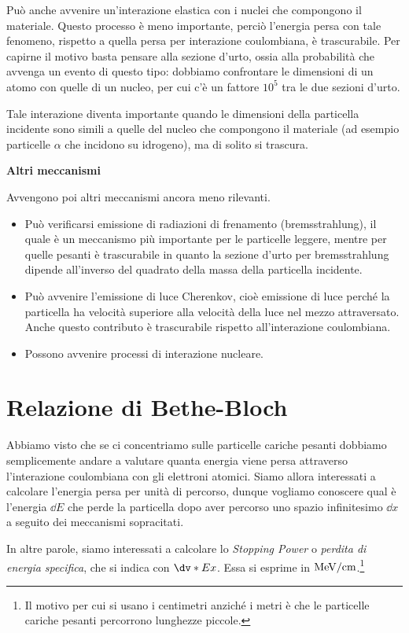 Può anche avvenire un'interazione elastica con i nuclei che compongono il materiale. Questo processo è meno importante, perciò l'energia persa con tale fenomeno, rispetto a quella persa per interazione coulombiana, è trascurabile. Per capirne il motivo basta pensare alla sezione d'urto, ossia alla probabilità che avvenga un evento di questo tipo: dobbiamo confrontare le dimensioni di un atomo con quelle di un nucleo, per cui c'è un fattore $10^5$ tra le due sezioni d'urto.

Tale interazione diventa importante quando le dimensioni della particella incidente sono simili a quelle del nucleo che compongono il materiale (ad esempio particelle $\alpha$ che incidono su idrogeno), ma di solito si trascura.

\vspace{0.2cm}\textbf{Altri meccanismi}

Avvengono poi altri meccanismi ancora meno rilevanti.
\begin{itemize}
    \item Può verificarsi emissione di radiazioni di frenamento (bremsstrahlung), il quale è un meccanismo più importante per le particelle leggere, mentre per quelle pesanti è trascurabile in quanto la sezione d'urto per bremsstrahlung dipende all'inverso del quadrato della massa della particella incidente.
    \item Può avvenire l'emissione di luce Cherenkov, cioè emissione di luce perché la particella ha velocità superiore alla velocità della luce nel mezzo attraversato. Anche questo contributo è trascurabile rispetto all'interazione coulombiana.
    \item Possono avvenire processi di interazione nucleare.
\end{itemize}

\section{Relazione di Bethe-Bloch}
Abbiamo visto che se ci concentriamo sulle particelle cariche pesanti dobbiamo semplicemente andare a valutare quanta energia viene persa attraverso l'interazione coulombiana con gli elettroni atomici. Siamo allora interessati a calcolare l'energia persa per unità di percorso, dunque vogliamo conoscere qual è l'energia $\dd{E}$ che perde la particella dopo aver percorso uno spazio infinitesimo $\dd{x}$ a seguito dei meccanismi sopracitati.

In altre parole, siamo interessati a calcolare lo \textit{Stopping Power} o \textit{perdita di energia specifica}, che si indica con $\dv*{E}{x}$. Essa si esprime in $\rm MeV/cm$.\footnote{Il motivo per cui si usano i centimetri anziché i metri è che le particelle cariche pesanti percorrono lunghezze piccole.}

